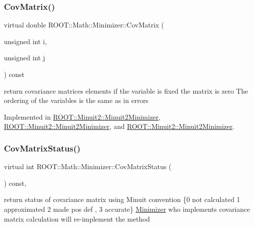 \subsubsection{\texorpdfstring{CovMatrix()}{CovMatrix()}\hspace{0.1cm}{\footnotesize\ttfamily [3/3]}}
{\footnotesize\ttfamily virtual double R\+O\+O\+T\+::\+Math\+::\+Minimizer\+::\+Cov\+Matrix (\begin{DoxyParamCaption}\item[{unsigned int}]{i,  }\item[{unsigned int}]{j }\end{DoxyParamCaption}) const\hspace{0.3cm}{\ttfamily [pure virtual]}}

return covariance matrices elements if the variable is fixed the matrix is zero The ordering of the variables is the same as in errors 

Implemented in \mbox{\hyperlink{classROOT_1_1Minuit2_1_1Minuit2Minimizer_a6ba10de01ab6e7228fa4908894de5619}{R\+O\+O\+T\+::\+Minuit2\+::\+Minuit2\+Minimizer}}, \mbox{\hyperlink{classROOT_1_1Minuit2_1_1Minuit2Minimizer_a6ba10de01ab6e7228fa4908894de5619}{R\+O\+O\+T\+::\+Minuit2\+::\+Minuit2\+Minimizer}}, and \mbox{\hyperlink{classROOT_1_1Minuit2_1_1Minuit2Minimizer_a6ba10de01ab6e7228fa4908894de5619}{R\+O\+O\+T\+::\+Minuit2\+::\+Minuit2\+Minimizer}}.

\mbox{\label{classROOT_1_1Math_1_1Minimizer_a5f5eab490760ff361d9c44369e9d754d}} 
\subsubsection{\texorpdfstring{CovMatrixStatus()}{CovMatrixStatus()}\hspace{0.1cm}{\footnotesize\ttfamily [1/3]}}
{\footnotesize\ttfamily virtual int R\+O\+O\+T\+::\+Math\+::\+Minimizer\+::\+Cov\+Matrix\+Status (\begin{DoxyParamCaption}{ }\end{DoxyParamCaption}) const\hspace{0.3cm}{\ttfamily [inline]}, {\ttfamily [virtual]}}

return status of covariance matrix using Minuit convention \{0 not calculated 1 approximated 2 made pos def , 3 accurate\} \mbox{\hyperlink{classROOT_1_1Math_1_1Minimizer}{Minimizer}} who implements covariance matrix calculation will re-\/implement the method 

